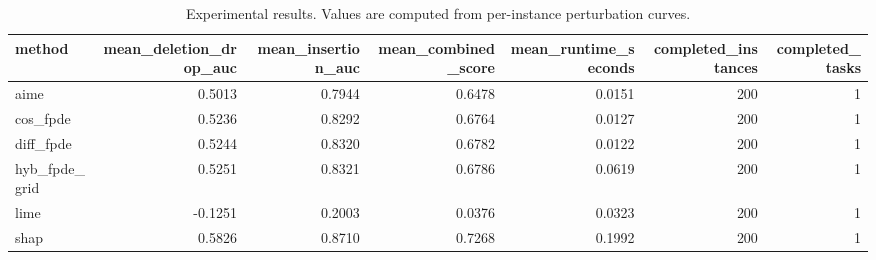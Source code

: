 \begin{table}[t]
\caption{Experimental results. Values are computed from per-instance perturbation curves.}
\label{tab:main_results_computed}
\centering
\begin{tabular}{lrrrrrr}
\toprule
method & mean\_deletion\_drop\_auc & mean\_insertion\_auc & mean\_combined\_score & mean\_runtime\_seconds & completed\_instances & completed\_tasks \\
\midrule
aime & 0.5013 & 0.7944 & 0.6478 & 0.0151 & 200 & 1 \\
cos\_fpde & 0.5236 & 0.8292 & 0.6764 & 0.0127 & 200 & 1 \\
diff\_fpde & 0.5244 & 0.8320 & 0.6782 & 0.0122 & 200 & 1 \\
hyb\_fpde\_grid & 0.5251 & 0.8321 & 0.6786 & 0.0619 & 200 & 1 \\
lime & -0.1251 & 0.2003 & 0.0376 & 0.0323 & 200 & 1 \\
shap & 0.5826 & 0.8710 & 0.7268 & 0.1992 & 200 & 1 \\
\bottomrule
\end{tabular}

\end{table}
